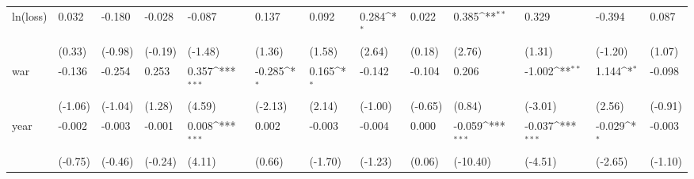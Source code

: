 \def\sym#1{\ifmmode^{#1}\else\(^{#1}\)\fi}
\begin{tabular}{p{1.5cm} p{1.7cm} p{1.7cm} p{1.7cm} p{1.7cm} p{1.7cm} p{1.7cm} p{1.7cm} p{1.7cm} p{1.7cm} p{1.7cm} p{1.7cm} p{1.7cm}}
\hline
ln(loss)        &    0.032         &   -0.180         &   -0.028         &   -0.087         &    0.137         &    0.092         &    0.284\sym{*}  &    0.022         &    0.385\sym{**} &    0.329         &   -0.394         &    0.087         \\
                &   (0.33)         &  (-0.98)         &  (-0.19)         &  (-1.48)         &   (1.36)         &   (1.58)         &   (2.64)         &   (0.18)         &   (2.76)         &   (1.31)         &  (-1.20)         &   (1.07)         \\
war             &   -0.136         &   -0.254         &    0.253         &    0.357\sym{***}&   -0.285\sym{*}  &    0.165\sym{*}  &   -0.142         &   -0.104         &    0.206         &   -1.002\sym{**} &    1.144\sym{*}  &   -0.098         \\
                &  (-1.06)         &  (-1.04)         &   (1.28)         &   (4.59)         &  (-2.13)         &   (2.14)         &  (-1.00)         &  (-0.65)         &   (0.84)         &  (-3.01)         &   (2.56)         &  (-0.91)         \\
year            &   -0.002         &   -0.003         &   -0.001         &    0.008\sym{***}&    0.002         &   -0.003         &   -0.004         &    0.000         &   -0.059\sym{***}&   -0.037\sym{***}&   -0.029\sym{*}  &   -0.003         \\
                &  (-0.75)         &  (-0.46)         &  (-0.24)         &   (4.11)         &   (0.66)         &  (-1.70)         &  (-1.23)         &   (0.06)         & (-10.40)         &  (-4.51)         &  (-2.65)         &  (-1.10)         \\
\end{tabular}
\def\sym#1{\ifmmode^{#1}\else\(^{#1}\)\fi}
